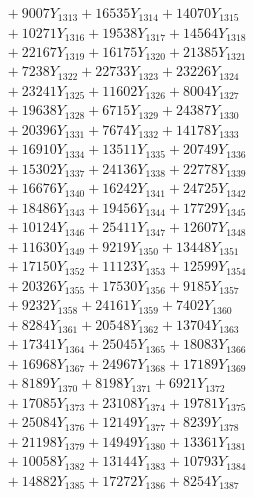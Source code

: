 \documentclass[a4paper,10pt]{article}
\begin{document}
{\begin{align}
&\;  + 9007 Y_{1313} + 16535 Y_{1314} + 14070 Y_{1315} \\[0.3ex]
&\;  + 10271 Y_{1316} + 19538 Y_{1317} + 14564 Y_{1318} \\[0.5ex]\allowbreak
&\;  + 22167 Y_{1319} + 16175 Y_{1320} + 21385 Y_{1321} \\[0.3ex]
&\;  + 7238 Y_{1322} + 22733 Y_{1323} + 23226 Y_{1324} \\[0.3ex]
&\;  + 23241 Y_{1325} + 11602 Y_{1326} + 8004 Y_{1327} \\[0.3ex]
&\;  + 19638 Y_{1328} + 6715 Y_{1329} + 24387 Y_{1330} \\[0.3ex]
&\;  + 20396 Y_{1331} + 7674 Y_{1332} + 14178 Y_{1333} \\[0.3ex]
&\;  + 16910 Y_{1334} + 13511 Y_{1335} + 20749 Y_{1336} \\[0.3ex]
&\;  + 15302 Y_{1337} + 24136 Y_{1338} + 22778 Y_{1339} \\[0.3ex]
&\;  + 16676 Y_{1340} + 16242 Y_{1341} + 24725 Y_{1342} \\[0.3ex]
&\;  + 18486 Y_{1343} + 19456 Y_{1344} + 17729 Y_{1345} \\[0.3ex]
&\;  + 10124 Y_{1346} + 25411 Y_{1347} + 12607 Y_{1348} \\[0.5ex]\allowbreak
&\;  + 11630 Y_{1349} + 9219 Y_{1350} + 13448 Y_{1351} \\[0.3ex]
&\;  + 17150 Y_{1352} + 11123 Y_{1353} + 12599 Y_{1354} \\[0.3ex]
&\;  + 20326 Y_{1355} + 17530 Y_{1356} + 9185 Y_{1357} \\[0.3ex]
&\;  + 9232 Y_{1358} + 24161 Y_{1359} + 7402 Y_{1360} \\[0.3ex]
&\;  + 8284 Y_{1361} + 20548 Y_{1362} + 13704 Y_{1363} \\[0.3ex]
&\;  + 17341 Y_{1364} + 25045 Y_{1365} + 18083 Y_{1366} \\[0.3ex]
&\;  + 16968 Y_{1367} + 24967 Y_{1368} + 17189 Y_{1369} \\[0.3ex]
&\;  + 8189 Y_{1370} + 8198 Y_{1371} + 6921 Y_{1372} \\[0.3ex]
&\;  + 17085 Y_{1373} + 23108 Y_{1374} + 19781 Y_{1375} \\[0.3ex]
&\;  + 25084 Y_{1376} + 12149 Y_{1377} + 8239 Y_{1378} \\[0.5ex]\allowbreak
&\;  + 21198 Y_{1379} + 14949 Y_{1380} + 13361 Y_{1381} \\[0.3ex]
&\;  + 10058 Y_{1382} + 13144 Y_{1383} + 10793 Y_{1384} \\[0.3ex]
&\;  + 14882 Y_{1385} + 17272 Y_{1386} + 8254 Y_{1387} \\[0.3ex]

\end{align}}
\end{document}
